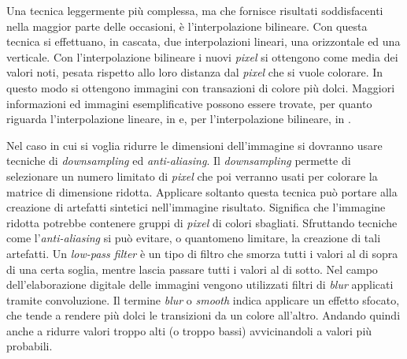Una tecnica leggermente più complessa, ma che fornisce risultati soddisfacenti nella maggior parte delle occasioni, è l'interpolazione bilineare.
Con questa tecnica si effettuano, in cascata, due interpolazioni lineari, una orizzontale ed una verticale.
Con l'interpolazione bilineare i nuovi \textit{pixel} si ottengono come media dei valori noti, pesata rispetto allo loro distanza dal \textit{pixel} che si vuole colorare.
In questo modo si ottengono immagini con transazioni di colore più dolci.
Maggiori informazioni ed immagini esemplificative possono essere trovate, per quanto riguarda l'interpolazione lineare, in \cite{linear-interpolation} e, per l'interpolazione bilineare, in \cite{bilinear-interpolation}.

Nel caso in cui si voglia ridurre le dimensioni dell'immagine si dovranno usare tecniche di \textit{downsampling} ed \textit{anti-aliasing}.
Il \textit{downsampling} permette di selezionare un numero limitato di \textit{pixel} che poi verranno usati per colorare la matrice di dimensione ridotta.
Applicare soltanto questa tecnica può portare alla creazione di artefatti sintetici nell'immagine risultato.
Significa che l'immagine ridotta potrebbe contenere gruppi di \textit{pixel} di colori sbagliati.
Sfruttando tecniche come l'\textit{anti-aliasing} si può evitare, o quantomeno limitare, la creazione di tali artefatti.
Un \textit{low-pass filter} è un tipo di filtro che smorza tutti i valori al di sopra di una certa soglia, mentre lascia passare tutti i valori al di sotto.
Nel campo dell'elaborazione digitale delle immagini vengono utilizzati filtri di \textit{blur} applicati tramite convoluzione.
Il termine \textit{blur} o \textit{smooth} indica applicare un effetto sfocato, che tende a rendere più dolci le transizioni da un colore all'altro.
Andando quindi anche a ridurre valori troppo alti (o troppo bassi) avvicinandoli a valori più probabili.


\clearpage
